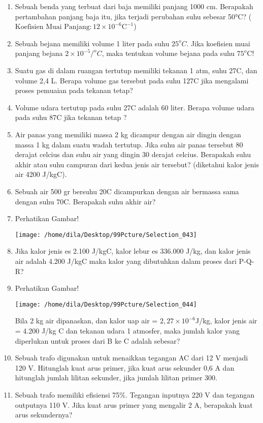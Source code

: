 \documentclass[12pt,a4paper,draft,final,oneside,twoside,openright,openany]{article}
\begin{document}
				\noindent\makebox[\linewidth]{\rule{\paperwidth}{0.4pt}}
	\begin{enumerate}
		\item Sebuah benda yang terbuat dari baja memiliki panjang 1000 cm. Berapakah pertambahan panjang baja itu, jika terjadi perubahan suhu sebesar 50°C? ($\text{Koefisien Muai Panjang} : 12\times 10^{-6} \text{C}^{-1}$)
		\item Sebuah bejana memiliki volume 1 liter pada suhu $25^oC$. Jika koefisien muai panjang bejana $2\times 10^{-5}/^{o}C$, maka tentukan volume bejana pada suhu $75^o$C!
		\item Suatu gas di dalam ruangan tertutup memiliki tekanan 1 atm, suhu 27\textdegree C, dan volume 2,4 L. Berapa volume gas tersebut pada suhu 127\textdegree C jika mengalami proses pemuaian pada tekanan tetap?
		\item Volume udara tertutup pada suhu 27\textdegree C adalah 60 liter. Berapa volume udara pada suhu 87\textdegree C jika tekanan tetap ?
		\item 
		Air panas yang memiliki massa 2 kg dicampur dengan air dingin dengan massa 1 kg dalam suatu wadah tertutup. Jika suhu air panas tersebut 80 derajat celcius dan suhu air yang dingin 30 derajat celcius. Berapakah suhu akhir atau suhu campuran dari kedua jenis air tersebut? (diketahui kalor jenis air 4200 J/kg\textdegree C).
		\item Sebuah air 500 gr bersuhu 20\textdegree C dicampurkan dengan air bermassa sama dengan suhu 70\textdegree C. Berapakah suhu akhir air?
		\item Perhatikan Gambar!
		\begin{center}
			\texttt{[image: /home/dila/Desktop/99Pcture/Selection\_043]}
		\end{center}
		\item Jika kalor jenis es 2.100 J/kg\textdegree C, kalor lebur es 336.000 J/kg, dan kalor jenis air adalah 4.200 J/kg\textdegree C maka kalor yang dibutuhkan dalam proses dari P-Q-R?
		\item Perhatikan Gambar!
			\begin{center}
				\texttt{[image: /home/dila/Desktop/99Pcture/Selection\_044]}
				\end{center}
		Bila 2 kg air dipanaskan, dan kalor uap air = $2,27\times 10^{-6} $J/kg, kalor jenis air = 4.200 J/kg \textdegree C dan tekanan udara 1 atmosfer, maka jumlah kalor yang diperlukan untuk proses dari B ke C adalah sebesar?
		\item Sebuah trafo digunakan untuk menaikkan tegangan AC dari 12 V menjadi 120 V. Hitunglah kuat arus primer, jika kuat arus sekunder 0,6 A dan hitunglah jumlah lilitan sekunder, jika jumlah lilitan primer 300.
		\item Sebuah trafo memiliki efisiensi 75$\%$. Tegangan inputnya 220 V dan tegangan outputnya 110 V. Jika kuat arus primer yang mengalir 2 A, berapakah kuat arus sekundernya?
	\end{enumerate}
\end{document}
